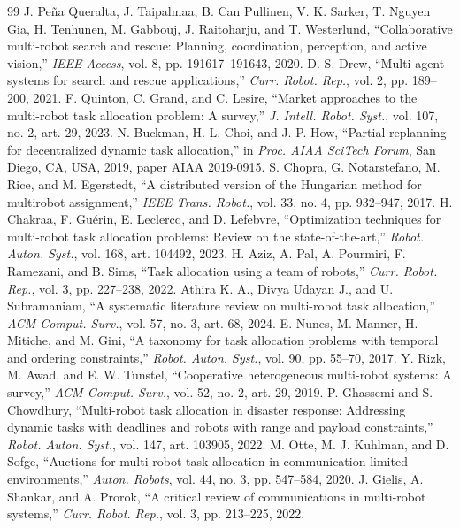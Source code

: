 \documentclass[conference]{IEEEtran}
\begin{document}
\begin{thebibliography}{99}
 J. Peña Queralta, J. Taipalmaa, B. Can Pullinen, V. K. Sarker, T. Nguyen Gia, H. Tenhunen, M. Gabbouj, J. Raitoharju, and T. Westerlund, ``Collaborative multi-robot search and rescue: Planning, coordination, perception, and active vision,'' \emph{IEEE Access}, vol. 8, pp. 191617--191643, 2020.
 D. S. Drew, ``Multi-agent systems for search and rescue applications,'' \emph{Curr. Robot. Rep.}, vol. 2, pp. 189--200, 2021.
 F. Quinton, C. Grand, and C. Lesire, ``Market approaches to the multi-robot task allocation problem: A survey,'' \emph{J. Intell. Robot. Syst.}, vol. 107, no. 2, art. 29, 2023.
 N. Buckman, H.-L. Choi, and J. P. How, ``Partial replanning for decentralized dynamic task allocation,'' in \emph{Proc. AIAA SciTech Forum}, San Diego, CA, USA, 2019, paper AIAA 2019-0915.
 S. Chopra, G. Notarstefano, M. Rice, and M. Egerstedt, ``A distributed version of the Hungarian method for multirobot assignment,'' \emph{IEEE Trans. Robot.}, vol. 33, no. 4, pp. 932--947, 2017.
 H. Chakraa, F. Guérin, E. Leclercq, and D. Lefebvre, ``Optimization techniques for multi-robot task allocation problems: Review on the state-of-the-art,'' \emph{Robot. Auton. Syst.}, vol. 168, art. 104492, 2023.
 H. Aziz, A. Pal, A. Pourmiri, F. Ramezani, and B. Sims, ``Task allocation using a team of robots,'' \emph{Curr. Robot. Rep.}, vol. 3, pp. 227--238, 2022.
 Athira K. A., Divya Udayan J., and U. Subramaniam, ``A systematic literature review on multi-robot task allocation,'' \emph{ACM Comput. Surv.}, vol. 57, no. 3, art. 68, 2024.
 E. Nunes, M. Manner, H. Mitiche, and M. Gini, ``A taxonomy for task allocation problems with temporal and ordering constraints,'' \emph{Robot. Auton. Syst.}, vol. 90, pp. 55--70, 2017.
 Y. Rizk, M. Awad, and E. W. Tunstel, ``Cooperative heterogeneous multi-robot systems: A survey,'' \emph{ACM Comput. Surv.}, vol. 52, no. 2, art. 29, 2019.
 P. Ghassemi and S. Chowdhury, ``Multi-robot task allocation in disaster response: Addressing dynamic tasks with deadlines and robots with range and payload constraints,'' \emph{Robot. Auton. Syst.}, vol. 147, art. 103905, 2022.
 M. Otte, M. J. Kuhlman, and D. Sofge, ``Auctions for multi-robot task allocation in communication limited environments,'' \emph{Auton. Robots}, vol. 44, no. 3, pp. 547--584, 2020.
 J. Gielis, A. Shankar, and A. Prorok, ``A critical review of communications in multi-robot systems,'' \emph{Curr. Robot. Rep.}, vol. 3, pp. 213--225, 2022.

\end{thebibliography}
\end{document}
